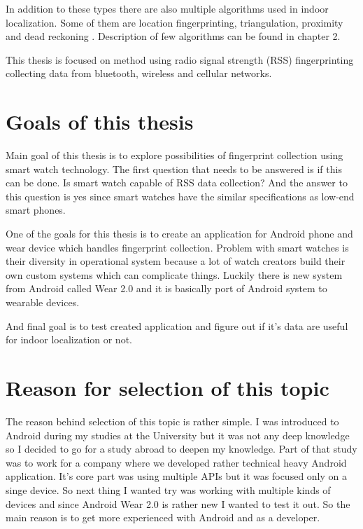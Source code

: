 In addition to these types there are also multiple algorithms used in indoor localization. Some of them are location fingerprinting, triangulation, proximity and dead reckoning \cite{AaPLocalisation}. Description of few algorithms can be found in chapter 2.

This thesis is focused on method using radio signal strength (RSS) fingerprinting collecting data from bluetooth, wireless and cellular networks.

\section{Goals of this thesis}\label{sec:GoalsOfThisThesis}
Main goal of this thesis is to explore possibilities of fingerprint collection using smart watch technology. The first question that needs to be answered is if this can be done. Is smart watch capable of RSS data collection? And the answer to this question is yes since smart watches have the similar specifications as low-end smart phones. 

One of the goals for this thesis is to create an application for Android phone and wear device which handles fingerprint collection. Problem with smart watches is their diversity in operational system because a lot of watch creators build their own custom systems which can complicate things. Luckily there is new system from Android called Wear 2.0 and it is basically port of Android system to wearable devices. 

And final goal is to test created application and figure out if it's data are useful for indoor localization or not.

\section{Reason for selection of this topic}\label{sec:ReasonForSelectionOfThisTopic}
The reason behind selection of this topic is rather simple. I was introduced to Android during my studies at the University but it was not any deep knowledge so I decided to go for a study abroad to deepen my knowledge. Part of that study was to work for a company where we developed rather technical heavy Android application. It's core part was using multiple APIs but it was focused only on a singe device. So next thing I wanted try was working with multiple kinds of devices and since Android Wear 2.0 is rather new I wanted to test it out. So the main reason is to get more experienced with Android and as a developer.